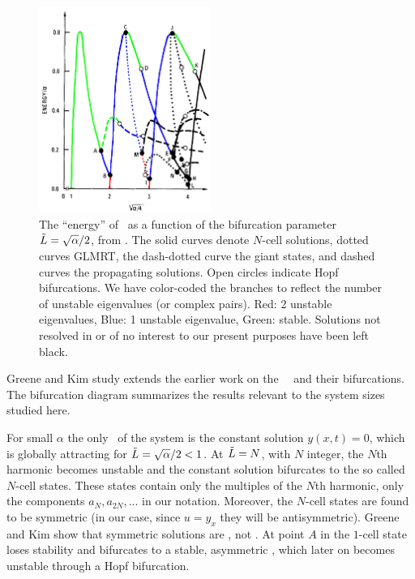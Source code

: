 \begin{description}
\begin{figure} \label{fig:GreeneKim}
\centering
\includegraphics[width=0.5\textwidth, clip=true]
                {../rpo_ks/figsUnused/GreeneKimBifColor}
\caption[The ``energy'' of \eqva\ as a function of the bifurcation parameter]
        {
The ``energy'' of \eqva\ as a function of the bifurcation
parameter $\tilde{L}=\sqrt{\alpha}/2$, from .
The solid curves denote $N$-cell solutions,
dotted curves GLMRT, the dash-dotted curve the
giant states, and dashed curves the propagating solutions.
Open circles indicate Hopf bifurcations.
We have color-coded the branches to reflect the number of unstable
eigenvalues (or complex pairs). Red: 2 unstable eigenvalues, Blue: 1
unstable eigenvalue, Green: stable. Solutions not
resolved in  or of no interest
to our present purposes have been left black.
        }
\end{figure}

Greene and Kim study extends the earlier work
on the \KS\ \eqva\ and their bifurcations. The
bifurcation diagram  summarizes the results
relevant to the system sizes studied here.

For small $\alpha$ the only \eqv\ of the system is the constant solution $y(x,t)=0$,
which is globally attracting
for $\tilde{L}=\sqrt{\alpha}/2<1$. At $\tilde{L}=N$, with $N$ integer,
the $N$th harmonic becomes unstable and the constant solution
bifurcates to the so called $N$-cell states.
These states contain only the multiples of the $N$th
harmonic, {\ie} only the components $a_N,a_{2N},...$ in our notation.
Moreover, the $N$-cell states are found to be symmetric (in our case, since $u=y_x$ they will be
antisymmetric).
Greene and Kim show that symmetric solutions are \eqva, not \reqva.
At point $A$ in  the $1$-cell state loses stability
and bifurcates to a stable,
asymmetric \reqv, which later on becomes unstable through a Hopf bifurcation.


\end{description}
